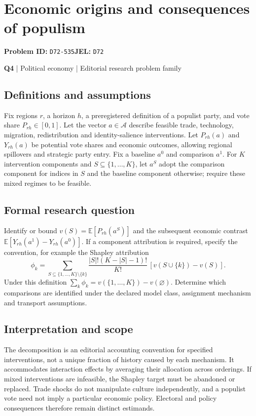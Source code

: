 \documentclass[11pt,a4paper]{article}
\begin{document}
\section*{Economic origins and consequences of populism}
\textbf{Problem ID:} \texttt{D72-535}\quad \textbf{JEL:} \texttt{D72}\par
\label{problem:OP-0124}
\label{atlas:prob:Q4}
{\sffamily\small\color{muted}\textbf{Q4} | Political economy | Editorial research problem family\par}
\subsection*{Definitions and assumptions}
Fix regions $r$, a horizon $h$, a preregistered definition of a populist party, and vote share $P_{rh}\in[0,1]$. Let the vector $a\in\mathcal A$ describe feasible trade, technology, migration, redistribution and identity-salience interventions. Let $P_{rh}(a)$ and $Y_{rh}(a)$ be potential vote shares and economic outcomes, allowing regional spillovers and strategic party entry. Fix a baseline $a^0$ and comparison $a^1$. For $K$ intervention components and $S\subseteq\{1,\ldots,K\}$, let $a^S$ adopt the comparison component for indices in $S$ and the baseline component otherwise; require these mixed regimes to be feasible.
\subsection*{Formal research question}
Identify or bound $v(S)=\mathbb E[P_{rh}(a^S)]$ and the subsequent economic contrast $\mathbb E[Y_{rh}(a^1)-Y_{rh}(a^0)]$. If a component attribution is required, specify the convention, for example the Shapley attribution
\[
\phi_k=\sum_{S\subseteq\{1,\ldots,K\}\setminus\{k\}}
\frac{|S|!(K-|S|-1)!}{K!}\,[v(S\cup\{k\})-v(S)].
\]
Under this definition $\sum_k\phi_k=v(\{1,\ldots,K\})-v(\varnothing)$. Determine which comparisons are identified under the declared model class, assignment mechanism and transport assumptions.
\subsection*{Interpretation and scope}
The decomposition is an editorial accounting convention for specified interventions, not a unique fraction of history caused by each mechanism. It accommodates interaction effects by averaging their allocation across orderings. If mixed interventions are infeasible, the Shapley target must be abandoned or replaced. Trade shocks do not manipulate culture independently, and a populist vote need not imply a particular economic policy. Electoral and policy consequences therefore remain distinct estimands.
\end{document}
